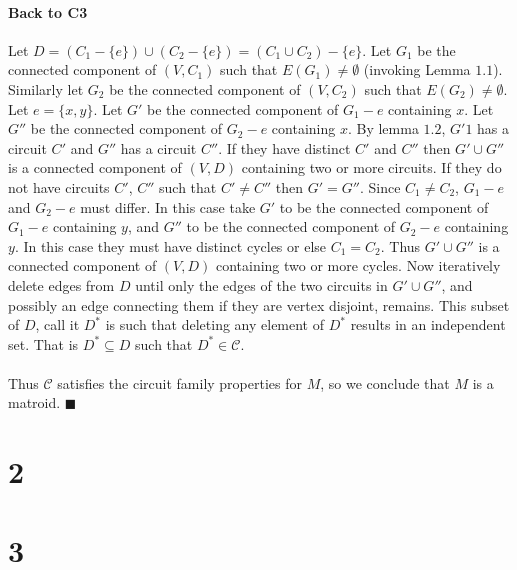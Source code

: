 \documentclass[letterpaper,12pt,oneside,onecolumn]{report}
\begin{document}
\paragraph{Back to C3}
Let $D = (C_1 - \{e\}) \cup (C_2 - \{e\}) = (C_1 \cup C_2) - \{e\}$. Let $G_1$ be the connected component of $(V,C_1)$ such that $E(G_1) \neq \emptyset$ (invoking Lemma $1.1$). Similarly let $G_2$ be the connected component of $(V,C_2)$ such that $E(G_2) \neq \emptyset$. Let $e = \{x,y\}$. Let $G'$ be the connected component of $G_1 - e$ containing $x$. Let $G''$ be the connected component of $G_2 - e$ containing $x$. By lemma $1.2$, $G'1$ has a circuit $C'$ and $G''$ has a circuit $C''$. If they have distinct $C'$ and $C''$ then $G' \cup G''$ is a connected component of $(V,D)$ containing two or more circuits. If they do not have circuits $C'$, $C''$ such that $C' \neq C''$ then $G' = G''$. Since $C_1 \neq C_2$, $G_1 - e$ and $G_2 - e$ must differ. In this case take $G'$ to be the connected component of $G_1 - e$ containing $y$, and $G''$ to be the connected component of $G_2 -e$ containing $y$. In this case they must have distinct cycles or else $C_1 = C_2$. Thus $G' \cup G''$ is a connected component of $(V,D)$ containing two or more cycles. Now iteratively delete edges from $D$ until only the edges of the two circuits in $G' \cup G''$, and possibly an edge connecting them if they are vertex disjoint, remains. This subset of $D$, call it $D^*$ is such that deleting any element of $D^*$ results in an independent set. That is $D^* \subseteq D$ such that $D^* \in \mathcal{C}$.
\paragraph{}
Thus $\mathcal{C}$ satisfies the circuit family properties for $M$, so we conclude that $M$ is a matroid. $\blacksquare$
\section*{2}
\section*{3}
\end{document}
